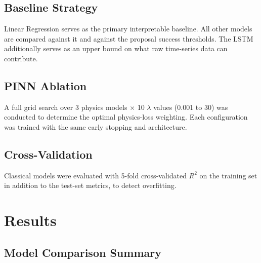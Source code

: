 \documentclass[10pt,letterpaper]{article}
\newcommand{\Rsq}{R^2}
\begin{document}
\subsection{Baseline Strategy}

Linear Regression serves as the primary interpretable baseline. All other models are compared
against it and against the proposal success thresholds. The LSTM additionally serves as an
upper bound on what raw time-series data can contribute.

\subsection{PINN Ablation}

A full grid search over 3 physics models $\times$ 10 $\lambda$ values (0.001 to 30) was
conducted to determine the optimal physics-loss weighting. Each configuration was trained
with the same early stopping and architecture.

\subsection{Cross-Validation}

Classical models were evaluated with 5-fold cross-validated $\Rsq$ on the training set in
addition to the test-set metrics, to detect overfitting.

\section{Results}
\label{sec:results}

\subsection{Model Comparison Summary}
\end{document}
